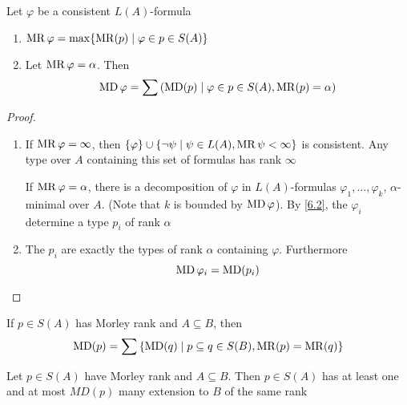 \documentclass[11pt]{article}
\begin{document}
\begin{lemma}[]
\label{lemma6.2.11}
Let \(\varphi\) be a consistent \(L(A)\)-formula
\begin{enumerate}
\item \(\operatorname{MR}\varphi=\max\{\operatorname{MR}(p)\mid\varphi\in p\in S(A)\}\)
\item Let \(\operatorname{MR}\varphi=\alpha\). Then
\begin{equation*}
\operatorname{MD}\varphi=\sum\left( \operatorname{MD}(p)\mid\varphi\in p\in S(A),\operatorname{MR}(p)=\alpha \right)
\end{equation*}
\end{enumerate}
\end{lemma}

\begin{proof}
\begin{enumerate}
\item If \(\operatorname{MR}\varphi=\infty\), then \(\{\varphi\}\cup\{\neg\psi\mid\psi\in L(A),\operatorname{MR}\psi<\infty\}\) is consistent.
Any type over \(A\) containing this set of formulas has rank \(\infty\)

If \(\operatorname{MR}\varphi=\alpha\), there is a decomposition of \(\varphi\) in \(L(A)\)-formulas \(\varphi_1,\dots,\varphi_k\), \(\alpha\)-minimal
over \(A\). (Note that \(k\) is bounded by \(\operatorname{MD}\varphi\)). By \eqref{6.2}, the \(\varphi_i\) determine a
type \(p_i\) of rank \(\alpha\)

\item The \(p_i\) are exactly the types of rank \(\alpha\) containing \(\varphi\). Furthermore
\begin{equation*}
\operatorname{MD}\varphi_i=\operatorname{MD}(p_i)
\end{equation*}
\end{enumerate}
\end{proof}

\begin{corollary}[]
If \(p\in S(A)\) has Morley rank and \(A\subseteq B\), then
\begin{equation*}
\operatorname{MD}(p)=\sum\left\{\operatorname{MD}(q)\mid p\subseteq q\in S(B),\operatorname{MR}(p)=\operatorname{MR}(q)\right\}
\end{equation*}
\end{corollary}

\begin{corollary}[]
Let \(p\in S(A)\) have Morley rank and \(A\subseteq B\). Then \(p\in S(A)\) has at least one and at
most \(MD(p)\) many extension to \(B\) of the same rank
\end{corollary}
\end{document}
